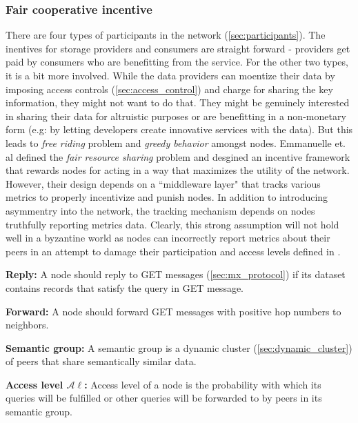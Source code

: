 \subsubsection{Fair cooperative incentive} \label{sec:fair_incentive}
There are four types of participants in the network (\cref{sec:participants}). The inentives for storage providers and consumers are straight forward - providers get paid by consumers who are benefitting from the service. For the other two types, it is a bit more involved. While the data providers can moentize their data by imposing access controls (\cref{sec:access_control}) and charge for sharing the key information, they might not want to do that. They might be genuinely interested in sharing their data for altruistic purposes or are benefitting in a non-monetary form (e.g: by letting developers create innovative services with the data). But this leads to \textit{free riding} problem and \textit{greedy behavior} amongst nodes. Emmanuelle et. al \cite{fair_incentives} defined the \textit{fair resource sharing} problem and desgined an incentive framework that rewards nodes for acting in a way that maximizes the utility of the network. However, their design depends on a ``middleware layer" that tracks various metrics to properly incentivize and punish nodes. In addition to introducing asymmentry into the network, the tracking mechanism depends on nodes truthfully reporting metrics data. Clearly, this strong assumption will not hold well in a byzantine world as nodes can incorrectly report metrics about their peers in an attempt to damage their participation and access levels defined in \cite{fair_incentives}.
\begin{remark}{\textbf{Reply:}} \label{reply_rule}
	A node should reply to GET messages (\cref{sec:mx_protocol}) if its dataset contains records that satisfy the query in GET message.
\end{remark}
\begin{remark}{\textbf{Forward:}} \label{forward_rule}
	A node should forward GET messages with positive hop numbers to neighbors.
\end{remark}
\begin{definition}{\textbf{Semantic group:}} \label{def:sem_group}
	A semantic group is a dynamic cluster (\cref{sec:dynamic_cluster}) of peers that share semantically similar data.
\end{definition}
\begin{definition}{\textbf{Access level $\mathcal{A}\ell$:}}
	Access level of a node is the probability with which its queries will be fulfilled or other queries will be forwarded to by peers in its semantic group.
\end{definition}
